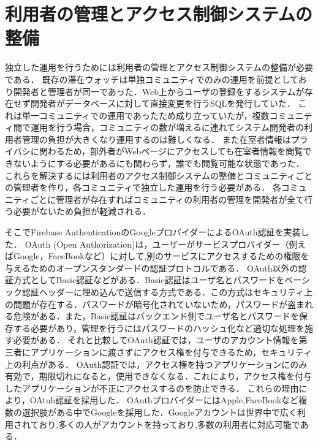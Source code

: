 

\section{利用者の管理とアクセス制御システムの整備}\label{4.2}
独立した運用を行うためには利用者の管理とアクセス制御システムの整備が必要である．
既存の滞在ウォッチは単独コミュニティでのみの運用を前提としており開発者と管理者が同一であった．Web上からユーザの登録をするシステムが存在せず開発者がデータベースに対して直接変更を行うSQLを発行していた．
これは単一コミュニティでの運用であったため成り立っていたが，複数コミュニティ間で運用を行う場合，コミュニティの数が増えるに連れてシステム開発者の利用者管理の負担が大きくなり運用するのは難しくなる．
また在室者情報はプライバシに関わるため，部外者がWebページにアクセスしても在室者情報を閲覧できないようにする必要があるにも関わらず，誰でも閲覧可能な状態であった．
これらを解決するには利用者のアクセス制御システムの整備とコミュニティごとの管理者を作り，各コミュニティで独立した運用を行う必要がある．
各コミュニティごとに管理者が存在すればコミュニティの利用者の管理を開発者が全て行う必要がないため負担が軽減される．


そこでFirebase AuthenticationのGoogleプロバイダーによるOAuth認証を実装した．
OAuth (Open Authorization)は，ユーザーがサービスプロバイダー（例えばGoogle，FaceBookなど）に対して,別のサービスにアクセスするための権限を与えるためのオープンスタンダードの認証プロトコルである．
OAuth以外の認証方式としてBasic認証などがある．Basic認証はユーザ名とパスワードをベーシック認証ヘッダーに埋め込んで送信する方式である．この方式はセキュリティ上の問題が存在する．パスワードが暗号化されていないため，パスワードが盗まれる危険がある．また，Basic認証はバックエンド側でユーザ名とパスワードを保存する必要があり，管理を行うにはパスワードのハッシュ化など適切な処理を施す必要がある．
それと比較してOAuth認証では，ユーザのアカウント情報を第三者にアプリケーションに渡さずにアクセス権を付与できるため，セキュリティ上の利点がある．
OAuth認証では，アクセス権を持つアプリケーションにのみ有効で，期限切れになると，使用できなくなる．これにより，アクセス権を付与したアプリケーションが不正にアクセスするのを防止できる．
これらの理由により，OAtuh認証を採用した．
OAuthプロバイダーにはApple,FaceBookなど複数の選択肢がある中でGoogleを採用した．Googleアカウントは世界中で広く利用されており,多くの人がアカウントを持っており,多数の利用者に対応可能である．

